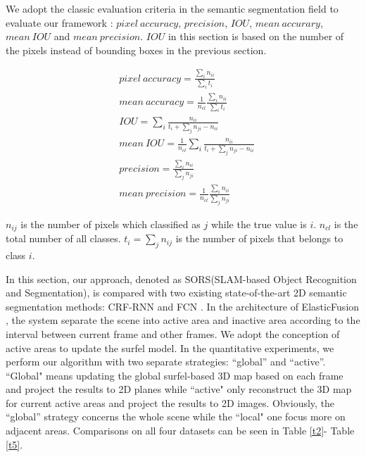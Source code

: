 \documentclass[conference]{IEEEtran}
\begin{document}
We adopt the classic evaluation criteria in the semantic segmentation field to evaluate our framework : $pixel\ accuracy $, $precision$, $IOU$, $mean\ accurary$, $mean\ IOU$ and $mean\ precision$. $IOU$ in this section is based on the number of the pixels instead of bounding boxes in the previous section. 
\begin{small}
	\begin{align}
	&pixel\ accuracy=\frac{\sum_{i}n_{ii}}{\sum_{i}t_{i}} \\
	&mean\ accuracy=\frac{1}{n_{cl}}\frac{\sum_{i}n_{ii}}{\sum_{i}t_{i}} \\ 
	&IOU=\sum_{i}\frac{n_{ii}}{t_{i}+\sum_{j}n_{ji}-n_{ii}}\\
	&mean\ IOU=\frac{1}{n_{cl}}\sum_{i}\frac{n_{ii}}{t_{i}+\sum_{j}n_{ji}-n_{ii}}\\
	&precision=\frac{\sum_{i}n_{ii}}{\sum_{j}n_{ji}} \\
	&mean\ precision=\frac{1}{n_{cl}}\frac{\sum_{i}n_{ii}}{\sum_{j}n_{ji}} 
	\end{align}
\end{small}

$n_{ij}$ is the number of pixels which classified as $j$ while the true value is $i$. $n_{cl}$ is the total number of all classes. $t_{i}=\sum_{j}n_{ij}$ is the number of pixels that belongs to class $i$.

In this section, our approach, denoted as SORS(SLAM-based Object Recognition and Segmentation), is compared with two existing  state-of-the-art 2D semantic segmentation methods: CRF-RNN \cite{Zheng2015}and FCN \cite{long2015fully}. In the architecture of ElasticFusion \cite{Whelan15rss}, the system separate the scene into active area and inactive area according to the interval between current frame and other frames. We adopt the conception of active areas to update the surfel model. In the quantitative experiments, we perform our algorithm  with two separate strategies:  ``global'' and ``active''. ``Global" means updating the global surfel-based 3D map based on each frame and project the results to 2D planes while ``active" only reconstruct the 3D map for current active areas and project the results to 2D images. Obviously, the ``global'' strategy concerns the whole scene while the ``local" one focus more on adjacent areas. Comparisons on all four datasets can be seen in Table \ref{t2}- Table \ref{t5}.
\end{document}

